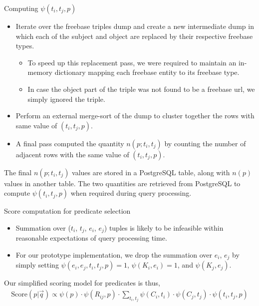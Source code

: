 \documentclass[pdf,11pt]{beamer}
\begin{document}
\begin{frame}{Computing $\psi(t_i, t_j, p)$}

\begin{itemize}
\item Iterate over the freebase triples dump and create a new intermediate dump in which each of the subject and object are replaced by their respective freebase types. 
\begin{itemize} \item To speed up this replacement pass, we were required to maintain an in-memory dictionary mapping each freebase entity to its freebase type. 
\item In case the object part of the triple was not found to be a freebase url, we simply ignored the triple.
\end{itemize}

\item Perform an external merge-sort of the dump to cluster together the rows with same value of $(t_i,t_j,p)$. 
\item A final pass computed the quantity $n(p;t_i,t_j)$ by counting the number of adjacent rows with the same value of $(t_i, t_j,p)$.

\end{itemize}

The final $n(p;t_i,t_j)$ values are stored in a PostgreSQL table, along with $n(p)$ values in another table. The two quantities are retrieved from PostgreSQL to compute $\psi(t_i,t_j,p)$ when required during query processing.

\end{frame}


\begin{frame}{Score computation for predicate selection}

\begin{itemize}
\item Summation over ($t_i$, $t_j$, $e_i$, $e_j$) tuples is likely to be infeasible within reasonable expectations of query processing time. 
\item For our prototype implementation, we drop the summation over $e_i$, $e_j$ by simply setting $\psi(e_i,e_j,t_i,	t_j,p) = 1$, $\psi(K_i,e_i) = 1$, and $\psi(K_j,e_j)$.
\end{itemize}

Our simplified scoring model for predicates is thus, 
\begin{align}
\text{Score}(p|\vec{q}) \propto \psi(p) \cdot \psi(R_{ij},p) \cdot \sum_{t_i,t_j} \psi(C_i,t_i) \cdot \psi(C_j,t_j) \cdot \psi(t_i,t_j,p) \nonumber
\end{align}

\end{frame}
\end{document}
